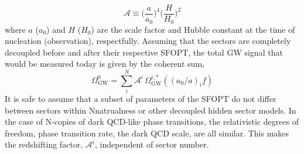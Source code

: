 \documentclass[nofootinbib,twocolumn,preprintnumbers]{revtex4-1}
\begin{document}
\begin{equation}\label{eqn::redshifting}
\mathcal{A} \equiv \bigg( \frac{a}{a_{0}} \bigg)^4 \bigg( \frac{H}{H_{0}}\bigg)^2
\end{equation}
where $a$ ($a_{0}$)  and $H$ ($H_{0}$) are the scale factor and Hubble constant at the time of nucleation (observation), respectfully. Assuming that the sectors are completely decoupled before and after their respective SFOPT, the total GW signal that would be measured today is given by the coherent sum,
\begin{equation}
\Omega_{\textrm{GW}}^{0} =  \sum_{i}^{N} \mathcal{A}^{i}\, \Omega_{\textrm{GW}}^{i,*}((a_{0}/a)_{i} f) 
\end{equation}
It is safe to assume that a subset of parameters of the SFOPT do not differ between sectors within Nnatrualness or other decoupled hidden sector models. In the case of N-copies of dark QCD-like phase transitions, the relativistic degrees of freedom, phase transition rate,  the dark QCD scale, are all similar. This makes the redshifting factor, $\mathcal{A}^i$, independent of sector number.
\end{document}
